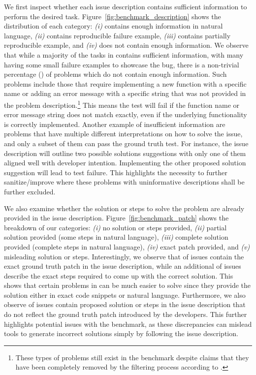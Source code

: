 We first inspect whether each issue description contains sufficient information to perform the desired task. 
Figure~\ref{fig:benchmark_description} shows the distribution of each category: \emph{(i)} contains enough information in natural language, \emph{(ii)} contains reproducible failure example, \emph{(iii)} contains partially reproducible example, and \emph{(iv)} does not contain enough information.%
We observe that while a majority of the tasks in \swebenchlite contains  sufficient information, with many having some small failure examples to showcase the bug, there is a non-trivial percentage (\notenoughinfo) of problems which do not contain enough information.
Such problems include those that require implementing a new function with a specific name or adding an error message with a specific string that was not provided in the problem description.\footnote{These types of problems still exist in the benchmark despite claims that they have been completely removed by the filtering process according to \href{www.swebench.com/lite.html}{\swebenchlite}.}
This means the test will fail if the function name or error message string does not match exactly, even if the underlying functionality is correctly implemented.
Another example of insufficient information are problems that have multiple different interpretations on how to solve the issue, and only a subset of them can pass the ground truth test.
For instance, the issue description will outline two possible solutions suggestions with only one of them aligned well with developer intention.  
Implementing the other proposed solution suggestion will lead to test failure.
This highlights the necessity to further sanitize/improve \swebenchlite{} where these problems with uninformative descriptions shall be further excluded.



We also examine whether the solution or steps to solve the problem are already provided in the issue description.
Figure~\ref{fig:benchmark_patch} shows the breakdown of our categories: {\emph{(i)} no solution or steps provided, \emph{(ii)} partial solution provided (\eg some steps in natural language), \emph{(iii)} complete solution provided (\eg complete steps in natural language), \emph{(iv)} exact patch provided, and \emph{(v)} misleading solution or steps.} 
Interestingly, we observe that \exactpatch of issues contain the exact ground truth patch in the issue description, while an additional \stepsinnl of issues describe the exact steps required to come up with the correct solution. 
This shows that certain problems in \swebenchlite can be much easier to solve since they provide the solution either in exact code snippets or natural language. 
Furthermore, we also observe \misleadingpatch of issues contain proposed solution or steps in the issue description that do not reflect the ground truth patch introduced by the developers.
This further highlights potential issues with the benchmark, as these discrepancies can mislead tools to generate incorrect solutions simply by following the issue description. 


